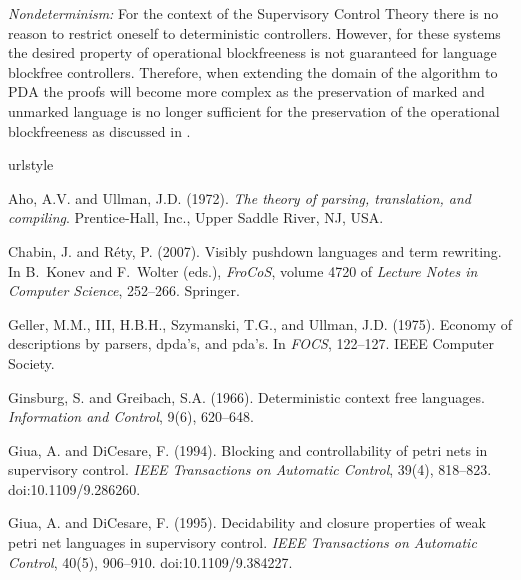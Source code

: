 \documentclass[draft]{ifacconf}
\newcommand{\PDA}{\ensuremath{\mathrm{PDA}}\xspace}
\newcommand{\myparagraph}[1]{\par\emph{#1:}}
\begin{document}
\myparagraph{Nondeterminism}
For the context of the Supervisory Control Theory there is no reason to restrict oneself to deterministic controllers. However, for these systems the desired property of operational blockfreeness is not guaranteed for language blockfree controllers. Therefore, when extending the domain of the algorithm to \PDA the proofs will become more complex as the preservation of marked and unmarked language is no longer sufficient for the preservation of the operational blockfreeness as discussed in \cite{SchneiderSchmuck2014}.

\begin{thebibliography}{15}
\providecommand{\natexlab}[1]{#1}
\providecommand{\url}[1]{\texttt{#1}}
\providecommand{\urlprefix}{URL }
\expandafter\ifx\csname urlstyle\endcsname\relax
  \providecommand{\doi}[1]{doi:\discretionary{}{}{}#1}\else
  \providecommand{\doi}{doi:\discretionary{}{}{}\begingroup
  \urlstyle{rm}\Url}\fi

Aho, A.V. and Ullman, J.D. (1972).
\newblock \emph{The theory of parsing, translation, and compiling}.
\newblock Prentice-Hall, Inc., Upper Saddle River, NJ, USA.

Chabin, J. and R{\'e}ty, P. (2007).
\newblock Visibly pushdown languages and term rewriting.
\newblock In B.~Konev and F.~Wolter (eds.), \emph{FroCoS}, volume 4720 of
  \emph{Lecture Notes in Computer Science}, 252--266. Springer.

Geller, M.M., III, H.B.H., Szymanski, T.G., and Ullman, J.D. (1975).
\newblock Economy of descriptions by parsers, dpda's, and pda's.
\newblock In \emph{FOCS}, 122--127. IEEE Computer Society.

Ginsburg, S. and Greibach, S.A. (1966).
\newblock Deterministic context free languages.
\newblock \emph{Information and Control}, 9(6), 620--648.

Giua, A. and DiCesare, F. (1994).
\newblock Blocking and controllability of petri nets in supervisory control.
\newblock \emph{IEEE Transactions on Automatic Control}, 39(4), 818--823.
\newblock \doi{10.1109/9.286260}.

Giua, A. and DiCesare, F. (1995).
\newblock Decidability and closure properties of weak petri net languages in
  supervisory control.
\newblock \emph{IEEE Transactions on Automatic Control}, 40(5), 906--910.
\newblock \doi{10.1109/9.384227}.


\end{thebibliography}
\end{document}
